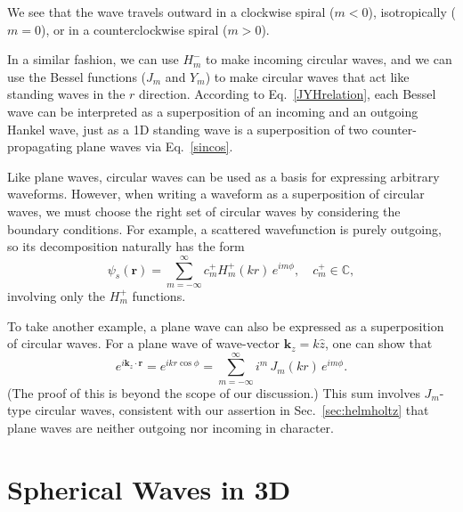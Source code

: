 \documentclass[pra,12pt]{revtex4-2}
\begin{document}
\noindent
We see that the wave travels outward in a clockwise spiral ($m < 0$),
isotropically ($m = 0$), or in a counterclockwise spiral ($m > 0$).

In a similar fashion, we can use $H_m^-$ to make incoming circular
waves, and we can use the Bessel functions ($J_m$ and $Y_m$) to make
circular waves that act like standing waves in the $r$ direction.
According to Eq.~\eqref{JYHrelation}, each Bessel wave can be
interpreted as a superposition of an incoming and an outgoing Hankel
wave, just as a 1D standing wave is a superposition of two
counter-propagating plane waves via Eq.~\eqref{sincos}.

Like plane waves, circular waves can be used as a basis for expressing
arbitrary waveforms.  However, when writing a waveform as a
superposition of circular waves, we must choose the right set of
circular waves by considering the boundary conditions.  For example, a
scattered wavefunction is purely outgoing, so its decomposition
naturally has the form
\begin{equation}
  \psi_s(\mathbf{r}) = \sum_{m=-\infty}^\infty c_m^+ H_m^+(kr) \, e^{im\phi},
  \quad c_m^+ \in \mathbb{C},
\end{equation}
involving only the $H_m^+$ functions.

To take another example, a plane wave can also be expressed as a
superposition of circular waves.  For a plane wave of wave-vector
$\mathbf{k}_z = k \hat{z}$, one can show that
\begin{equation}
  e^{i\mathbf{k}_z \cdot \mathbf{r}} =
  e^{ikr\cos\phi} = \sum_{m=-\infty}^\infty i^m \, J_m(kr)\, e^{im\phi}.
  \label{eikrcosphi}
\end{equation}
(The proof of this is beyond the scope of our discussion.)  This sum
involves $J_m$-type circular waves, consistent with our assertion in
Sec.~\ref{sec:helmholtz} that plane waves are neither outgoing nor
incoming in character.

\section{Spherical Waves in 3D}
\label{sec:spherical}
\end{document}
